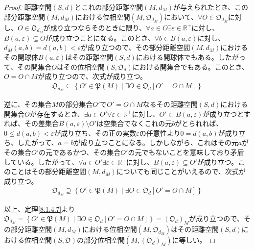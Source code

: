 \documentclass[dvipdfmx]{jsarticle}
\begin{document}
\begin{proof}
距離空間$(S,d)$とこれの部分距離空間$\left( M,d_{M} \right)$が与えられたとき、この部分距離空間$\left( M,d_{M} \right)$における位相空間$\left( M,\mathfrak{O}_{d_{M}} \right)$において、$\forall O \in \mathfrak{O}_{d_{M}}$に対し、$O \in \mathfrak{O}_{d_{M}}$が成り立つならそのときに限り、$\forall a \in O\exists\varepsilon \in \mathbb{R}^{+}$に対し、$B(a,\varepsilon) \subseteq O$が成り立つことになる。このとき、$\forall b \in B(a,\varepsilon)$に対し、$d_{M}(a,b) = d(a,b) < \varepsilon$が成り立つので、その部分距離空間$\left( M,d_{M} \right)$におけるその開球体$B(a,\varepsilon)$はその距離空間$(S,d)$における開球体でもある。したがって、その開集合$O$はその位相空間$\left( S,\mathfrak{O}_{d} \right)$における開集合でもある。このとき、$O = O \cap M$が成り立つので、次式が成り立つ。
\begin{align*}
\mathfrak{O}_{d_{M}} \subseteq \left\{ O'\in \mathfrak{P}(M) \middle| \exists O \in \mathfrak{O}_{d}\left[ O' = O \cap M \right] \right\}
\end{align*}\par
逆に、その集合$M$の部分集合$O'$で$O' = O \cap M$なるその距離空間$(S,d)$における開集合$O$が存在するとき、$\exists a \in O'\forall\varepsilon \in \mathbb{R}^{+}$に対し、$O' \subset B(a,\varepsilon)$が成り立つとすれば、その差集合$B(a,\varepsilon) \setminus O'$は空集合でなくこれの元$b$がとられれば、$0 \leq d(a,b) < \varepsilon$が成り立ち、その正の実数$\varepsilon$の任意性より$0 = d(a,b)$が成り立ち、したがって、$a = b$が成り立つことになる。しかしながら、これはその元$a$がその集合$O'$の元であるかつ、その集合$O'$の元でもないことを意味しており矛盾している。したがって、$\forall a \in O'\exists\varepsilon \in \mathbb{R}^{+}$に対し、$B(a,\varepsilon) \subseteq O'$が成り立つ。このことはその部分距離空間$\left( M,d_{M} \right)$についても同じことがいえるので、次式が成り立つ。
\begin{align*}
\mathfrak{O}_{d_{M}} \supseteq \left\{ O'\in \mathfrak{P}(M) \middle| \exists O \in \mathfrak{O}_{d}\left[ O' = O \cap M \right] \right\}
\end{align*}\par
以上、定理\ref{8.1.4.7}より$\mathfrak{O}_{d_{M}} = \left\{ O'\in \mathfrak{P}(M) \middle| \exists O \in \mathfrak{O}_{d}\left[ O' = O \cap M \right] \right\} = \left( \mathfrak{O}_{d} \right)_{M}$が成り立つので、その部分距離空間$\left( M,d_{M} \right)$における位相空間$\left( M,\mathfrak{O}_{d_{M}} \right)$はその距離空間$(S,d)$における位相空間$\left( S,\mathfrak{O} \right)$の部分位相空間$\left( M,\left( \mathfrak{O}_{d} \right)_{M} \right)$に等しい。
\end{proof}
\end{document}
